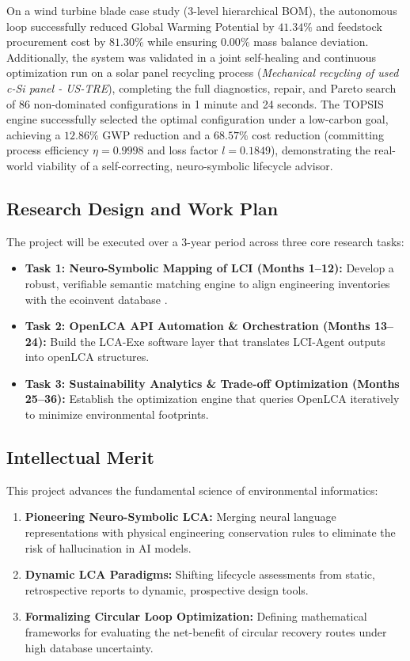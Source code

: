 \documentclass[11pt]{article}
\begin{document}
On a wind turbine blade case study (3-level hierarchical BOM), the autonomous loop successfully reduced Global Warming Potential by $41.34\%$ and feedstock procurement cost by $81.30\%$ while ensuring $0.00\%$ mass balance deviation. Additionally, the system was validated in a joint self-healing and continuous optimization run on a solar panel recycling process (\textit{Mechanical recycling of used c-Si panel - US-TRE}), completing the full diagnostics, repair, and Pareto search of 86 non-dominated configurations in 1 minute and 24 seconds. The TOPSIS engine successfully selected the optimal configuration under a low-carbon goal, achieving a $12.86\%$ GWP reduction and a $68.57\%$ cost reduction (committing process efficiency $\eta = 0.9998$ and loss factor $l = 0.1849$), demonstrating the real-world viability of a self-correcting, neuro-symbolic lifecycle advisor.


\subsection{Research Design and Work Plan}
The project will be executed over a 3-year period across three core research tasks:
\begin{itemize}
    \item \textbf{Task 1: Neuro-Symbolic Mapping of LCI (Months 1–12):} Develop a robust, verifiable semantic matching engine to align engineering inventories with the ecoinvent database \cite{mensikova2026, nwagwu2025}.
    \item \textbf{Task 2: OpenLCA API Automation \& Orchestration (Months 13–24):} Build the LCA-Exe software layer that translates LCI-Agent outputs into openLCA structures.
    \item \textbf{Task 3: Sustainability Analytics \& Trade-off Optimization (Months 25–36):} Establish the optimization engine that queries OpenLCA iteratively to minimize environmental footprints.
\end{itemize}

\subsection{Intellectual Merit}
This project advances the fundamental science of environmental informatics:
\begin{enumerate}
    \item \textbf{Pioneering Neuro-Symbolic LCA:} Merging neural language representations with physical engineering conservation rules to eliminate the risk of hallucination in AI models.
    \item \textbf{Dynamic LCA Paradigms:} Shifting lifecycle assessments from static, retrospective reports to dynamic, prospective design tools.
    \item \textbf{Formalizing Circular Loop Optimization:} Defining mathematical frameworks for evaluating the net-benefit of circular recovery routes under high database uncertainty.
\end{enumerate}
\end{document}
